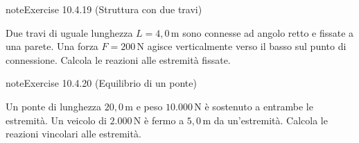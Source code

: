 \documentclass[letterpaper,10pt,italian]{jupyterBook}
\begin{document}
\begin{sphinxadmonition}{note}{Exercise 10.4.19 (Struttura con due travi)}



\sphinxAtStartPar
Due travi di uguale lunghezza \(L = 4,0 \, \text{m}\) sono connesse ad angolo retto e fissate a una parete. Una forza \(F = 200 \, \text{N}\) agisce verticalmente verso il basso sul punto di connessione. Calcola le reazioni alle estremità fissate.
\end{sphinxadmonition}
 \label{exercise:ch/mechanics/statics-problems-exercise-19}

\begin{sphinxadmonition}{note}{Exercise 10.4.20 (Equilibrio di un ponte)}



\sphinxAtStartPar
Un ponte di lunghezza \(20,0 \, \text{m}\) e peso \(10.000 \, \text{N}\) è sostenuto a entrambe le estremità. Un veicolo di \(2.000 \, \text{N}\) è fermo a \(5,0 \, \text{m}\) da un’estremità. Calcola le reazioni vincolari alle estremità.
\end{sphinxadmonition}
\end{document}
